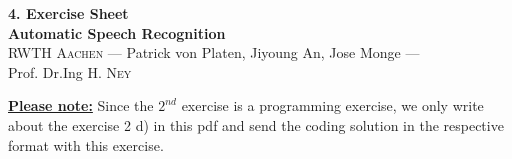 \documentclass[12pt,oneside,a4paper]{article}
\begin{document}
\begin{center}
{\LARGE \bfseries 
 4. Exercise Sheet  \\[0.1cm] 
}
{ \large \bfseries
 Automatic Speech Recognition \\[0.3cm] %
}
{\large
  \textsc{RWTH Aachen} --- Patrick von Platen, Jiyoung An, Jose Monge ---\\[0.3cm]
}
{\normalsize
  Prof. Dr.Ing H. \textsc{Ney} \\[0.92cm] %
}
\end{center}

{
\underline{\textbf{Please note:}}
Since the $2^{nd}$ exercise is a programming exercise, we only write about the exercise 2 d) in this pdf and send the 
coding solution in the respective format with this exercise.
}
  
 \newpage


\end{document}
